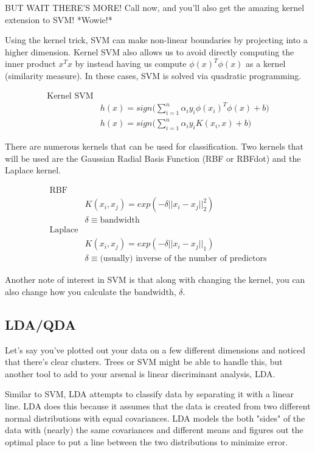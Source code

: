 \documentclass[a4paper]{article}
\begin{document}
BUT WAIT THERE'S MORE! Call now, and you'll also get the amazing kernel extension to SVM! *Wowie!*

Using the kernel trick, SVM can make non-linear boundaries by projecting into a higher dimension. Kernel SVM also allows us to avoid directly computing the inner product $x^Tx$ by instead having us compute $\phi(x)^T\phi(x)$ as a kernel (similarity measure). In these cases, SVM is solved via quadratic programming. %


\begin{align*}
\text{Kernel SVM} \\
& h(x)=sign\Bigg(\sum_{i=1}^n\alpha_iy_i\phi(x_i)^T\phi(x)+b\Bigg)\\
&h(x)=sign\Bigg(\sum_{i=1}^n\alpha_iy_iK(x_i,x)+b\Bigg)
\end{align*}

There are numerous kernels that can be used for classification. Two kernels that will be used are the Gaussian Radial Basis Function (RBF or RBFdot) and the Laplace kernel.

\begin{align*}
\text{RBF} \\
& K(x_i,x_j)=exp(-\delta||x_i-x_j||_2^2)\\
&\delta\equiv\text{bandwidth}\\
\text{Laplace} \\
& K(x_i,x_j)=exp(-\delta||x_i-x_j||_1)\\
&\delta\equiv \text{(usually) inverse of the number of predictors}
\end{align*}

Another note of interest in SVM is that along with changing the kernel, you can also change how you calculate the bandwidth, $\delta$.  

\subsection{LDA/QDA}

Let's say you've plotted out your data on a few different dimensions and noticed that there's clear clusters. Trees or SVM might be able to handle this, but another tool to add to your arsenal is linear discriminant analysis, LDA.

Similar to SVM, LDA attempts to classify data by separating it with a linear line. LDA does this because it assumes that the data is created from two different normal distributions with equal covariances. LDA models the both "sides" of the data with (nearly) the same covariances and different means and figures out the optimal place to put a line between the two distributions to minimize error.
\end{document}
